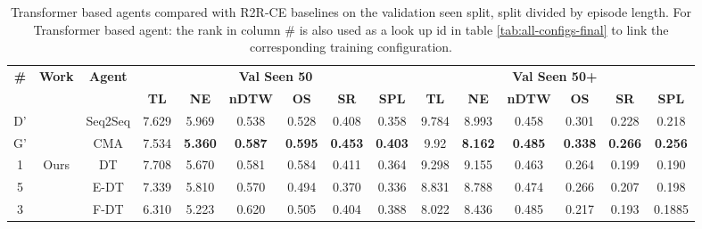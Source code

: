 \begin{table}
\centering
\caption{\label{tab:best_seen_50}Transformer based agents compared with R2R-CE baselines on the validation seen split, split divided by episode length. For Transformer based agent: the rank in column \# is also used as a look up id in table \ref{tab:all-configs-final} to link the corresponding training configuration.}
\begin{tabular}{@{\hskip3pt}c@{\hskip3pt}c@{\hskip3pt}c@{\hskip3pt}c@{\hskip3pt}c@{\hskip3pt}c@{\hskip3pt}c@{\hskip3pt}c@{\hskip3pt}c@{\hskip3pt}c@{\hskip3pt}c@{\hskip3pt}c@{\hskip3pt}c@{\hskip3pt}c@{\hskip3pt}c}
\toprule
\textbf{\#} & \textbf{Work} & \textbf{Agent} & \multicolumn{6}{c}{\textbf{Val Seen 50}} & \multicolumn{6}{c}{\textbf{Val Seen 50+}} \\
\cmidrule(l){4-9}\cmidrule(l){10-15}\textbf{~} &     \textbf{~} &                \textbf{~} &       \textbf{TL} &    \textbf{NE} &   \textbf{nDTW} &     \textbf{OS} &    \textbf{SR} &    \textbf{SPL} &         \textbf{TL} &     \textbf{NE} &   \textbf{nDTW} &     \textbf{OS} &    \textbf{SR} &    \textbf{SPL} \\
\midrule
          D' &             \citet{VLNCE}  &                  Seq2Seq &             7.629 &          5.969 &           0.538 &   0.528 &   0.408 &           0.358 &                9.784 &           8.993 &           0.458 &  0.301 &  0.228 &  0.218 \\
          G' &            &  CMA &             7.534 &          \textbf{5.360} &           \textbf{0.587} &           \textbf{0.595} &          \textbf{0.453} &           \textbf{0.403} &               9.92 &           \textbf{8.162} &           \textbf{0.485} &           \textbf{0.338} &          \textbf{0.266} &           \textbf{0.256} \\
\midrule
          1 &            Ours  &                  DT &             7.708&          5.670 &           0.581 &   0.584 &  0.411 &           0.364 &                9.298 &     9.155      &    0.463       &  0.264 & 0.199  &  0.190 \\
          5 &            &  E-DT &             7.339 &          5.810 &           0.570 &           0.494 &       0.370    &       0.336     &              8.831 &           8.788 &           0.474 &           0.266 &          0.207 &           0.198 \\
          3 &            &  F-DT &              6.310 &  5.223 &  0.620 &        0.505    &        0.404   &    0.388 &               8.022 &  8.436 &  0.485 &       0.217      &          0.193 &           0.1885 \\
\bottomrule
\end{tabular}
\end{table}
